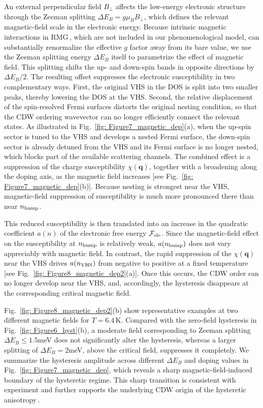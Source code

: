 \documentclass[aps,prx,article,twocolumn,amsmath,amssymb,superscriptaddress,longbibliography]{revtex4-2}
\begin{document}
An external perpendicular field $B_{\perp}$ affects the low-energy electronic structure through the Zeeman splitting $\Delta E_B = g \mu_B B_{\perp}$, which defines the relevant magnetic-field scale in the electronic energy. Because intrinsic magnetic interactions in RMG\,\cite{huang2023spin}, which are not included in our phenomenological model, can substantially renormalize the effective $g$ factor away from its bare value, we use the Zeeman splitting energy $\Delta E_B$ itself to parametrize the effect of magnetic field. This splitting shifts the up- and down-spin bands in opposite directions by $\Delta E_B/2$. The resulting offset suppresses the electronic susceptibility in two complementary ways. First, the original VHS in the DOS is split into two smaller peaks, thereby lowering the DOS at the VHS. Second, the relative displacement of the spin-resolved Fermi surfaces distorts the original nesting condition, so that the CDW ordering wavevector can no longer efficiently connect the relevant states. As illustrated in Fig.~\ref{fig: Figure7_magnetic_dep}(a), when the up-spin sector is tuned to the VHS and develops a nested Fermi surface, the down-spin sector is already detuned from the VHS and its Fermi surface is no longer nested, which blocks part of the available scattering channels. The combined effect is a suppression of the charge susceptibility $\chi(\mathbf{q})$, together with a broadening along the doping axis, as the magnetic field increases [see Fig.~\ref{fig: Figure7_magnetic_dep}(b)]. Because nesting is strongest near the VHS, magnetic-field suppression of susceptibility is much more pronounced there than near $n_{\rm bump}$.

This reduced susceptibility is then translated into an increase in the quadratic coefficient $a(n)$ of the electronic free energy $\mathcal{F}_{\rm ele}$. Since the magnetic-field effect on the susceptibility at $n_{\rm bump}$ is relatively weak, $a(n_{\rm bump})$ does not vary appreciably with magnetic field. In contrast, the rapid suppression of the $\chi(\mathbf{q})$ near the VHS drives $a(n_{\rm VHS})$ from negative to positive at a fixed temperature [see Fig.~\ref{fig: Figure8_magnetic_dep2}(a)]. Once this occurs, the CDW order can no longer develop near the VHS, and, accordingly, the hysteresis disappears at the corresponding critical magnetic field. 

Fig.~\ref{fig: Figure8_magnetic_dep2}(b) show representative examples at two different magnetic fields for $T=6.4$\,K. Compared with the zero-field hysteresis in Fig.~\ref{fig: Figure6_hyst}(b), a moderate field corresponding to Zeeman splitting $\Delta E_B \leq 1.5$meV does not significantly alter the hysteresis, whereas a larger splitting of $\Delta E_B = 2$meV, above the critical field, suppresses it completely. We summarize the hysteresis amplitude across different $\Delta E_B$ and doping values in Fig.~\ref{fig: Figure7_magnetic_dep}, which reveals a sharp magnetic-field-induced boundary of the hysteretic regime. This sharp transition is consistent with experiment and further supports the underlying CDW origin of the hysteretic anisotropy\,\cite{zhao2026hysteretical}.
\end{document}
